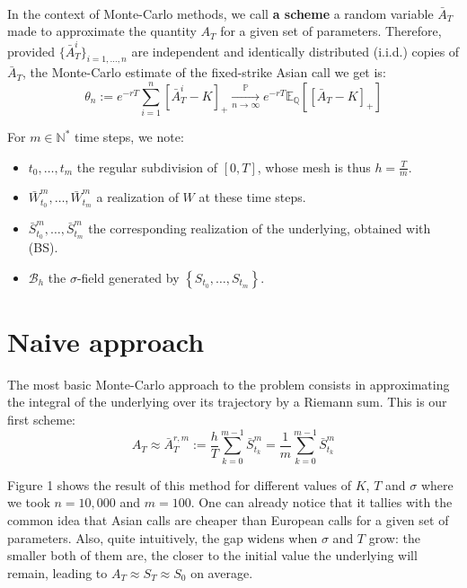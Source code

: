 \documentclass{article}
\begin{document}
\

In the context of Monte-Carlo methods, we call \textbf{a scheme} a random variable $\bar A_T$ made to approximate
the quantity $A_T$ for a given set of parameters. Therefore, provided $\{ \bar A_T^i \}_{i = 1, \dots, n}$ are
independent and identically distributed (i.i.d.) copies of $\bar A_T$, the Monte-Carlo estimate of the fixed-strike
Asian call we get is:
\[
	\theta_n := e^{-rT} \sum_{i=1}^n \left[ \bar A_T^i - K \right]_+ \xrightarrow[n \to \infty]{\mathbb P}
	e^{-rT} \mathbb E_{\mathbb Q} \left[ [ \bar A_T - K ]_+ \right]
\]

For $m \in \mathbb N^*$ time steps, we note:
\begin{itemize}[label=$\cdot$]
\item $t_0, \dots, t_m$ the regular subdivision of $[0, T]$, whose mesh is thus $h = \frac{T}{m}$.
\item $\bar W_{t_0}^m, \dots, \bar W_{t_m}^m$ a realization of $W$ at these time steps.
\item $\bar S_{t_0}^m, \dots, \bar S_{t_m}^m$ the corresponding realization of the underlying, obtained
	with (BS).
\item $\mathcal B_h$ the $\sigma$-field generated by $\left\{ S_{t_0}, \dots, S_{t_m} \right\}$.
\end{itemize}

\section{Naive approach}

The most basic Monte-Carlo approach to the problem consists in approximating the integral
of the underlying over its trajectory by a Riemann sum. This is our first scheme:
\begin{equation}
	A_T \approx \bar A_T^{r, m} := \frac{h}{T} \sum_{k=0}^{m-1} \bar S_{t_k}^m
	= \frac{1}{m} \sum_{k=0}^{m-1} \bar S_{t_k}^m 
	\tag{1}
\end{equation}

Figure 1 shows the result
of this method for different values of $K$, $T$ and $\sigma$ where we took $n =10,000$ and $m=100$.
One can already notice that it tallies with the common idea that Asian calls are cheaper than European calls
for a given set of parameters. Also, quite intuitively, the gap widens when $\sigma$ and $T$ grow: the smaller
both of them are, the closer to the initial value the underlying will remain, leading to $A_T \approx S_T \approx S_0$
on average.
\end{document}
